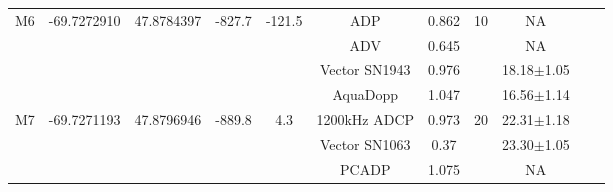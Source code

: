 \documentclass[letterpaper,10pt,landscape]{article}
\begin{document}
\begin{table}
\begin{tabular}{|c|c|c|c|c|c|c|c|c|c|c|}
      \multirow{4}{*}{M6} & \multirow{4}{*}{-69.7272910} & \multirow{4}{*}{47.8784397} & \multirow{4}{*}{-827.7}   & \multirow{4}{*}{-121.5} & ADP                & 0.862      & \multirow{4}{*}{10} & NA                & \\ 
                          &                              &                             &                           &                         & ADV                & 0.645      &                     & NA                & \\ 
                          &                              &                             &                           &                         & Vector SN1943      & 0.976      &                     & 18.18$\pm$1.05    & \\ 
                          &                              &                             &                           &                         & AquaDopp           & 1.047      &                     & 16.56$\pm$1.14    & \\ \hline
                                                                                                                                                                                                                          
      \multirow{3}{*}{M7} & \multirow{3}{*}{-69.7271193} & \multirow{3}{*}{47.8796946} & \multirow{3}{*}{-889.8}   & \multirow{3}{*}{4.3}    & 1200kHz ADCP       & 0.973      & \multirow{3}{*}{20} & 22.31$\pm$1.18    & \\ 
                          &                              &                             &                           &                         & Vector SN1063      & 0.37       &                     & 23.30$\pm$1.05    & \\ 
                          &                              &                             &                           &                         & PCADP              & 1.075      &                     & NA                & \\ \hline
                                                                                                                                                                                                                          

\end{tabular}
\end{table}
\end{document}
